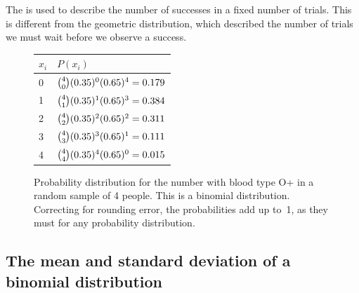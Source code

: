 The 
is used to describe
the number of successes in a fixed number of trials.
This is different from the geometric distribution,
which described the number of trials we must wait before
we observe a success.

\begin{figure}[h]
\begin{minipage}[c]{0.37\textwidth}\centering%
\begin{tabular}{l l}
$x_i$ & $P(x_i)$ \\
\hline
0 &  ${4\choose 0}(0.35{})^0(0.65{})^{4} = 0.179$ \vspace{1mm}\\
1 &  ${4\choose 1}(0.35{})^1(0.65{})^{3} = 0.384$  \vspace{1mm}\\
2 & ${4\choose 2}(0.35{})^2(0.65{})^{2} = 0.311$  \vspace{1mm}\\
3 & ${4\choose 3}(0.35{})^3(0.65{})^{1} = 0.111$  \vspace{1mm}\\
4 & ${4\choose 4}(0.35{})^4(0.65{})^{0} = 0.015$  \vspace{1mm}\\
\hline
\end{tabular}
\end{minipage}
\begin{minipage}[c]{0.6\textwidth}\centering%
\end{minipage}
\caption{Probability distribution for the number with blood type O+ in a random sample of 4 people. This is a binomial distribution. Correcting for rounding error, the probabilities add up to~1, as they must for any probability distribution.}
\label{oPositive4}
\label{binomDistrOPositive}
\end{figure}



\subsection{The mean and standard deviation of a binomial distribution}

